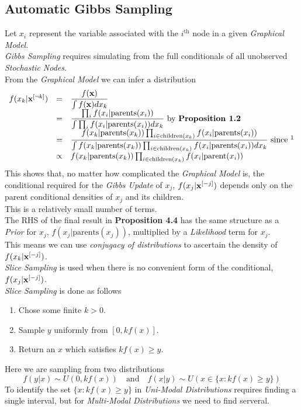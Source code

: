 \documentclass[11pt,a4paper]{article}
\begin{document}
\subsection{Automatic Gibbs Sampling}

Let $x_i$ represent the variable associated with the $i^\text{th}$ node in a given \textit{Graphical Model}.\\
\textit{Gibbs Sampling} requires simulating from the full conditionals of all unobserved \textit{Stochastic Nodes}.\\
From the \textit{Graphical Model} we can infer a distribution
\[\begin{array}{rcl}
f(x_k|\x^{[\neg k]})&=&\dfrac{f(\x)}{\int f(\x)dx_k}\\
&=&\dfrac{\prod_if(x_i|\text{parents}(x_i))}{\int\prod_if(x_i|\text{parents}(x_i))dx_k}\text{ by \textbf{Proposition 1.2}}\\
&=&\dfrac{f(x_k|\text{parents}(x_k))\prod_{i\in\text{children}(x_k)}f(x_i|\text{parents}(x_i))}{\int f(x_k|\text{parents}(x_k))\prod_{i\in\text{children}(x_k)}f(x_i|\text{parents}(x_i))dx_k}\text{ since \footnotemark}\\
&\propto&f(x_k|\text{parents}(x_k))\prod_{i\in\text{children}(x_k)}f(x_i|\text{parent}(x_i))
\end{array}\]
This shows that, no matter how complicated the \textit{Graphical Model} is, the conditional required for the \textit{Gibbs Update} of $x_j$, $f(x_j|\textbf{x}^{[-j]})$ depends only on the parent conditional densities of $x_j$ and its children.\\
This is a relatively small number of terms.\\

The RHS of the final result in \textbf{Proposition 4.4} has the same structure as a \textit{Prior} for $x_j$, $f(x_j|\text{parents}(x_j))$, multiplied by a \textit{Likelihood} term for $x_j$.\\
This means we can use \textit{conjugacy of distributions} to ascertain the density of $f(x_k|\textbf{x}^{[-j]})$.\\

\textit{Slice Sampling} is used when there is no convenient form of the conditional, $f(x_j|\textbf{x}^{[-j]})$.\\
\textit{Slice Sampling} is done as follows
\begin{enumerate}
	\item Chose some finite $k>0$.
	\item Sample $y$ uniformly from $[0,kf(x)]$.
	\item Return an $x$ which satisfies $kf(x)\geq y$.
\end{enumerate}
Here we are sampling from two distributions
$$f(y|x)\sim U(0,kf(x))\quad\text{and}\quad f(x|y)\sim U(x\in\{x:kf(x)\geq y\})$$
To identify the set $\{x:kf(x)\geq y\}$ in \textit{Uni-Modal Distributions} requires finding a single interval, but for \textit{Multi-Modal Distributions} we need to find serveral.
\end{document}

